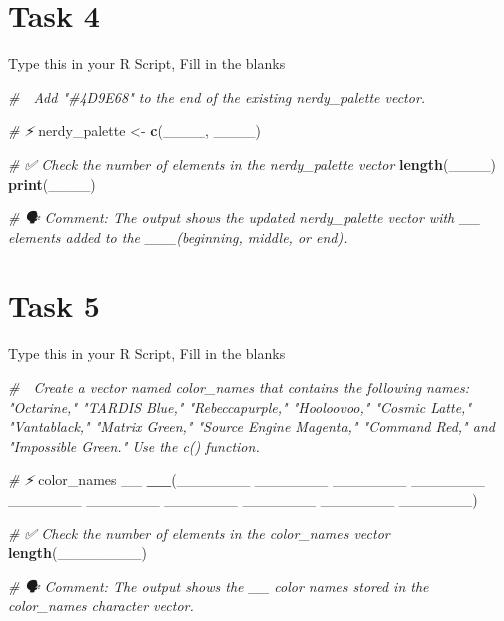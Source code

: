 \documentclass[
  12pt,
]{scrreprt}
\newenvironment{Shaded}{\begin{snugshade}}{\end{snugshade}}
\newcommand{\CommentTok}[1]{\textcolor[rgb]{0.56,0.35,0.01}{\textit{#1}}}
\newcommand{\FunctionTok}[1]{\textcolor[rgb]{0.13,0.29,0.53}{\textbf{#1}}}
\newcommand{\NormalTok}[1]{#1}
\newcommand{\OtherTok}[1]{\textcolor[rgb]{0.56,0.35,0.01}{#1}}
\begin{document}
\section{Task 4}\label{task-4}

Type this in your R Script, Fill in the blanks

\begin{Shaded}
\begin{Highlighting}[]
\CommentTok{\# 🎯 Add "\#4D9E68" to the end of the existing \textasciigrave{}nerdy\_palette\textasciigrave{} vector.}


\CommentTok{\# ⚡}
\NormalTok{nerdy\_palette }\OtherTok{\textless{}{-}} \FunctionTok{c}\NormalTok{(\_\_\_\_, \_\_\_\_)}

\CommentTok{\# ✅ Check the number of elements in the nerdy\_palette vector}
\FunctionTok{length}\NormalTok{(\_\_\_\_)}
\FunctionTok{print}\NormalTok{(\_\_\_\_)}


\CommentTok{\# 🗣 Comment: The output shows the updated \textasciigrave{}nerdy\_palette\textasciigrave{} vector with \_\_ elements added to the \_\_\_(beginning, middle, or end).}
\end{Highlighting}
\end{Shaded}

\section{Task 5}\label{task-5}

Type this in your R Script, Fill in the blanks

\begin{Shaded}
\begin{Highlighting}[]
\CommentTok{\# 🎯 Create a vector named \textasciigrave{}color\_names\textasciigrave{} that contains the following names: "Octarine," "TARDIS Blue," "Rebeccapurple," "Hooloovoo," "Cosmic Latte," "Vantablack," "Matrix Green," "Source Engine Magenta," "Command Red," and "Impossible Green." Use the \textasciigrave{}c()\textasciigrave{} function.}

\CommentTok{\# ⚡ }
\NormalTok{color\_names \_\_  }\FunctionTok{\_\_}\NormalTok{(\_\_\_\_\_\_\_ \_\_\_\_\_\_\_ \_\_\_\_\_\_\_ \_\_\_\_\_\_\_ \_\_\_\_\_\_\_ \_\_\_\_\_\_\_ \_\_\_\_\_\_\_ \_\_\_\_\_\_\_ \_\_\_\_\_\_\_ \_\_\_\_\_\_\_)}

\CommentTok{\# ✅ Check the number of elements in the color\_names vector}
\FunctionTok{length}\NormalTok{(\_\_\_\_\_\_\_\_)}


\CommentTok{\# 🗣 Comment: The output shows the \_\_ color names stored in the \textasciigrave{}color\_names\textasciigrave{} character vector.}
\end{Highlighting}
\end{Shaded}
\end{document}
